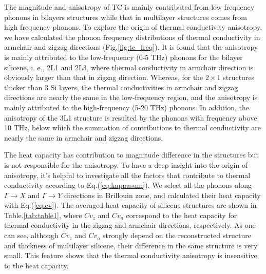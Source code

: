 \documentclass[review]{elsarticle}
\begin{document}
The magnitude and anisotropy of TC is mainly contributed from low frequency phonons in bilayers structures while that in multilayer structures comes from high frequency phonons. To explore the origin of thermal conductivity anisotropy, we have calculated the phonon frequency distributions of thermal conductivity in armchair and zigzag directions  (Fig.\ref{fig:tc_freq}).
It is found that the anisotropy is mainly attributed to the low-frequency (0-5 THz) phonons for the bilayer silicene, i. e., 2L1 and 2L3, where thermal conductivity in armchair direction is obviously larger than that in zigzag direction.
Whereas,  for the $2\times1$ structures thicker than 3 Si layers, the thermal conductivities in armchair and zigzag directions are nearly the same in the low-frequency region, and the anisotropy is mainly attributed to the high-frequency (5-20 THz) phonons.
In addition, the anisotropy of the 3L1 structure is resulted by the phonons with frequency above 10 THz, below which the summation of contributions to thermal conductivity are nearly the same in armchair and zigzag directions.

The heat capacity has contribution to magnitude difference in the structures but is not responsible for the anisotropy. To have a deep insight into the origin of anisotropy, it's helpful to investigate all the factors that contribute to thermal conductivity according to Eq.(\ref{eq:kappasum}).
We select all the phonons along  $\Gamma\rightarrow X$ and $\Gamma \rightarrow Y$ directions in Brillouin zone, and calculated their heat capacity with Eq.(\ref{eq:cv}). The averaged heat capacity of silicene structures are shown in Table.\ref{tab:table1}, where $Cv_z$ and $Cv_a$ correspond to the  heat capacity for thermal conductivity in the zigzag and armchair directions, respectively.  As one can see, although $Cv_z$ and $Cv_a$  strongly depend on the reconstructed structure and thickness of multilayer silicene, their difference in the same structure is very small. This feature shows that the thermal conductivity anisotropy is insensitive to the heat capacity.
\end{document}
